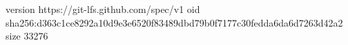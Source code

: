 version https://git-lfs.github.com/spec/v1
oid sha256:d363c1ce8292a10d9e3e6520f83489dbd79b0f7177c30fedda6da6d7263d42a2
size 33276
